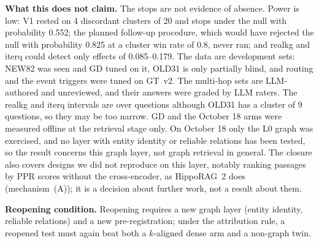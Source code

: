\textbf{What this does not claim.} The stops are not evidence of absence.
Power is low: V1 rested on 4 discordant clusters of 20 and stops under
the null with probability 0.552; the planned follow-up procedure, which
would have rejected the null with probability 0.825 at a cluster win
rate of 0.8, never ran; and realkg and iterq could detect only effects
of 0.085--0.179. The data are development sets: NEW82 was seen and GD
tuned on it, OLD31 is only partially blind, and routing and the event
triggers were tuned on GT~v2. The multi-hop sets are LLM-authored and
unreviewed, and their answers were graded by LLM raters. The realkg and
iterq intervals are over questions although OLD31 has a cluster of 9
questions, so they may be too narrow. GD and the October 18 arms were
measured offline at the retrieval stage only. On October 18 only the L0
graph was exercised, and no layer with entity identity or reliable
relations has been tested, so the result concerns this graph layer, not
graph retrieval in general. The closure also covers designs we did not
reproduce on this layer, notably ranking passages by PPR scores without
the cross-encoder, as HippoRAG~2 does (mechanism~(A)); it is a decision
about further work, not a result about them.

\textbf{Reopening condition.} Reopening requires a new graph layer
(\eg entity identity, reliable relations) and a new pre-registration;
under the attribution rule, a reopened test must again beat both a
$k$-aligned dense arm and a non-graph twin.
